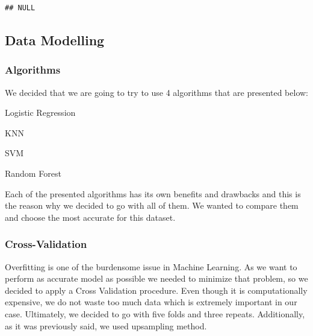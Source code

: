 \documentclass[
]{article}
\newenvironment{Shaded}{\begin{snugshade}}{\end{snugshade}}
\newcommand{\DecValTok}[1]{\textcolor[rgb]{0.00,0.00,0.81}{#1}}
\newcommand{\NormalTok}[1]{#1}
\newcommand{\OperatorTok}[1]{\textcolor[rgb]{0.81,0.36,0.00}{\textbf{#1}}}
\newcommand{\StringTok}[1]{\textcolor[rgb]{0.31,0.60,0.02}{#1}}
\begin{document}
\begin{Shaded}
\end{Shaded}

\begin{verbatim}
## NULL
\end{verbatim}

\hypertarget{data-modelling}{%
\subsection{Data Modelling}\label{data-modelling}}

\hypertarget{algorithms-1}{%
\subsubsection{Algorithms}\label{algorithms-1}}

We decided that we are going to try to use 4 algorithms that are
presented below:

Logistic Regression

KNN

SVM

Random Forest

Each of the presented algorithms has its own benefits and drawbacks and
this is the reason why we decided to go with all of them. We wanted to
compare them and choose the most accurate for this dataset.

\hypertarget{cross-validation}{%
\subsubsection{Cross-Validation}\label{cross-validation}}

Overfitting is one of the burdensome issue in Machine Learning. As we
want to perform as accurate model as possible we needed to minimize that
problem, so we decided to apply a Cross Validation procedure. Even
though it is computationally expensive, we do not waste too much data
which is extremely important in our case. Ultimately, we decided to go
with five folds and three repeats. Additionally, as it was previously
said, we used upsampling method.
\end{document}
